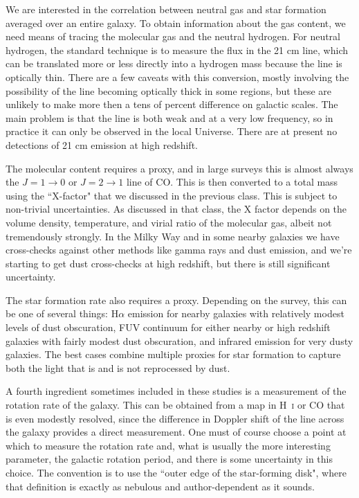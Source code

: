 We are interested in the correlation between neutral gas and star formation averaged over an entire galaxy. To obtain information about the gas content, we need means of tracing the molecular gas and the neutral hydrogen. For neutral hydrogen, the standard technique is to measure the flux in the 21 cm line, which can be translated more or less directly into a hydrogen mass because the line is optically thin. There are a few caveats with this conversion, mostly involving the possibility of the line becoming optically thick in some regions, but these are unlikely to make more then a tens of percent difference on galactic scales. The main problem is that the line is both weak and at a very low frequency, so in practice it can only be observed in the local Universe. There are at present no detections of 21 cm emission at high redshift.

The molecular content requires a proxy, and in large surveys this is almost always the $J=1\rightarrow 0$ or $J=2\rightarrow 1$ line of CO. This is then converted to a total mass using the ``X-factor" that we discussed in the previous class. This is subject to non-trivial uncertainties. As discussed in that class, the X factor depends on the volume density, temperature, and virial ratio of the molecular gas, albeit not tremendously strongly. In the Milky Way and in some nearby galaxies we have cross-checks against other methods like gamma rays and dust emission, and we're starting to get dust cross-checks at high redshift, but there is still significant uncertainty.

The star formation rate also requires a proxy. Depending on the survey, this can be one of several things: H$\alpha$ emission for nearby galaxies with relatively modest levels of dust obscuration, FUV continuum for either nearby or high redshift galaxies with fairly modest dust obscuration, and infrared emission for very dusty galaxies. The best cases combine multiple proxies for star formation to capture both the light that is and is not reprocessed by dust.

A fourth ingredient sometimes included in these studies is a measurement of the rotation rate of the galaxy. This can be obtained from a map in H~\textsc{i} or CO that is even modestly resolved, since the difference in Doppler shift of the line across the galaxy provides a direct measurement. One must of course choose a point at which to measure the rotation rate and, what is usually the more interesting parameter, the galactic rotation period, and there is some uncertainty in this choice. The convention is to use the ``outer edge of the star-forming disk", where that definition is exactly as nebulous and author-dependent as it sounds.

